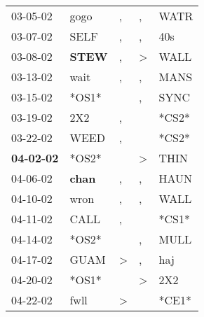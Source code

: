 \begin{supertabular}{p{0.07\textwidth}p{0.06\textwidth}p{0.02\textwidth}p{0.02\textwidth}p{0.06\textwidth}}
          03-05-02\textsuperscript{} &           gogo\textsuperscript{} &                , &             , &           WATR\textsuperscript{} \\
          03-07-02\textsuperscript{} &           SELF\textsuperscript{} &                , &             , &            40s\textsuperscript{} \\
          03-08-02\textsuperscript{} &  \textbf{STEW\textsuperscript{}} &                , &  \textgreater &           WALL\textsuperscript{} \\
          03-13-02\textsuperscript{} &           wait\textsuperscript{} &                , &             , &           MANS\textsuperscript{} \\
          03-15-02\textsuperscript{} &                            *OS1* &                  &             , &           SYNC\textsuperscript{} \\
          03-19-02\textsuperscript{} &            2X2\textsuperscript{} &                , &               &                            *CS2* \\
          03-22-02\textsuperscript{} &           WEED\textsuperscript{} &                , &               &                            *CS2* \\
 \textbf{04-02-02\textsuperscript{}} &                            *OS2* &                  &  \textgreater &           THIN\textsuperscript{} \\
          04-06-02\textsuperscript{} &  \textbf{chan\textsuperscript{}} &                , &             , &           HAUN\textsuperscript{} \\
          04-10-02\textsuperscript{} &           wron\textsuperscript{} &                , &             , &           WALL\textsuperscript{} \\
          04-11-02\textsuperscript{} &           CALL\textsuperscript{} &                , &               &                            *CS1* \\
          04-14-02\textsuperscript{} &                            *OS2* &                  &             , &           MULL\textsuperscript{} \\
          04-17-02\textsuperscript{} &           GUAM\textsuperscript{} &     \textgreater &             , &            haj\textsuperscript{} \\
          04-20-02\textsuperscript{} &                            *OS1* &                  &  \textgreater &            2X2\textsuperscript{} \\
          04-22-02\textsuperscript{} &           fwll\textsuperscript{} &     \textgreater &               &                            *CE1* \\

\end{supertabular}
